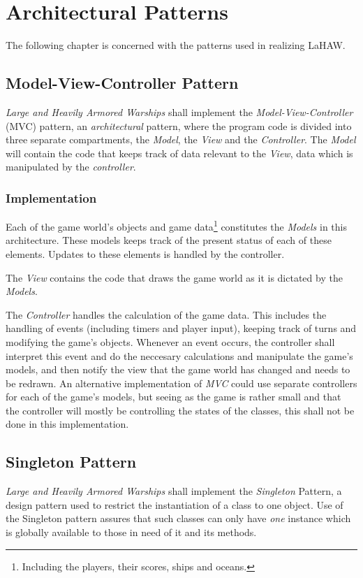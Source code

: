\chapter{Architectural Patterns}
The following chapter is concerned with the patterns used in realizing LaHAW.


    \section{Model-View-Controller Pattern}
    \emph{Large and Heavily Armored Warships} shall implement the \emph{Model-View-Controller} (MVC) pattern, an \emph{architectural} pattern, where the program code is divided into three separate compartments, the \emph{Model}, the \emph{View} and the \emph{Controller}. The \emph{Model} will contain the code that keeps track of data relevant to the \emph{View}, data which is manipulated by the \emph{controller}.
    
        \subsection{Implementation}
        Each of the game world's objects and game data\footnote{Including the players, their scores, ships and oceans.} constitutes the \emph{Models} in this architecture. These models keeps track of the present status of each of these elements. Updates to these elements is handled by the controller.
    
        The \emph{View} contains the code that draws the game world as it is dictated by the \emph{Models}.
    
        The \emph{Controller} handles the calculation of the game data. This includes the handling of events (including timers and player input), keeping track of turns and modifying the game's objects.
        Whenever an event occurs, the controller shall interpret this event and do the neccesary calculations and manipulate the game's models, and then notify the view that the game world has changed and needs to be redrawn.
        An alternative implementation of \emph{MVC} could use separate controllers for each of the game's models, but seeing as the game is rather small and that the controller will mostly be controlling the states of the classes, this shall not be done in this implementation.


    \section{Singleton Pattern}
    \emph{Large and Heavily Armored Warships} shall implement the \emph{Singleton} Pattern, a design pattern used to restrict the instantiation of a class to one object\cite{singleton}.
    Use of the Singleton pattern assures that such classes can only have \emph{one} instance which is globally available to those in need of it and its methods.
    
